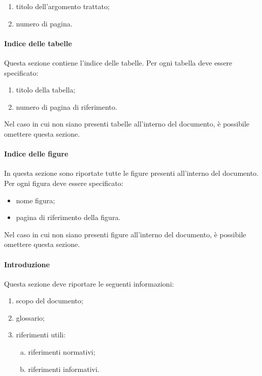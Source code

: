 \documentclass[../NormeProgetto.tex]{subfiles}
\begin{document}
			\begin{enumerate}
				\item titolo dell'argomento trattato;
				\item numero di pagina.
			\end{enumerate}

		\paragraph{Indice delle tabelle}
			Questa sezione contiene l'indice delle tabelle. Per ogni tabella deve essere specificato:

			\begin{enumerate}
				\item titolo della tabella;
				\item numero di pagina di riferimento.
			\end{enumerate}

			Nel caso in cui non siano presenti tabelle all'interno del documento, è possibile omettere questa sezione.

		\paragraph{Indice delle figure}
			In questa sezione sono riportate tutte le figure presenti all'interno del documento. Per ogni figura deve essere specificato:
			\begin{itemize}
				\item nome figura;
				\item pagina di riferimento della figura.
			\end{itemize}
			Nel caso in cui non siano presenti figure all'interno del documento, è possibile omettere questa sezione.

		\paragraph{Introduzione}
			Questa sezione deve riportare le seguenti informazioni:
			\begin{enumerate}
				\item scopo del documento;
				\item glossario;
				\item riferimenti utili:
				\begin{enumerate}[a.]
					\item riferimenti normativi;
					\item riferimenti informativi.
				\end{enumerate}
			\end{enumerate}
\end{document}
